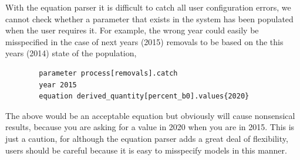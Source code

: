 With the equation parser it is difficult to catch all user configuration errors, we cannot check whether a parameter that exists in the system has been populated when the user requires it. For example, the wrong year could easily be misspecified in the case of next years (2015) removals to be based on the this years (2014) state of the population,
{\small{\begin{verbatim}
		parameter process[removals].catch
		year 2015
		equation derived_quantity[percent_b0].values{2020}
		\end{verbatim}}}

The above would be an acceptable equation but obviously will cause nonsensical results, because you are asking for a value in 2020 when you are in 2015. This is just a caution, for although the equation parser adds a great deal of flexibility, users should be careful because it is easy to misspecify models in this manner.
